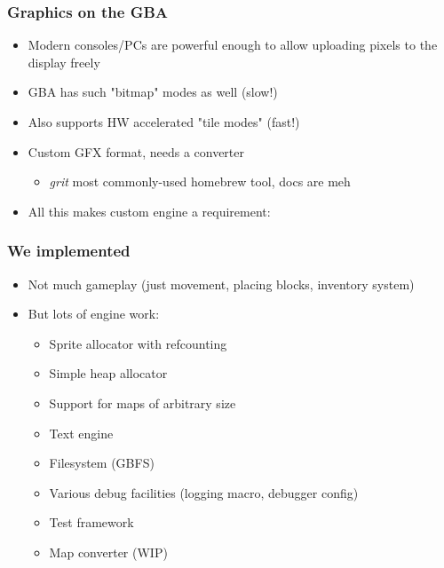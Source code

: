 \documentclass{beamer}
\begin{document}
\begin{frame}
	\frametitle{Graphics on the GBA}
	\begin{itemize}
		\item Modern consoles/PCs are powerful enough to allow uploading pixels to the display freely
		\item GBA has such "bitmap" modes as well (slow!)
		\item Also supports HW accelerated "tile modes" (fast!)
		\item Custom GFX format, needs a converter \begin{itemize}
			      \item \emph{grit} most commonly-used homebrew tool, docs are meh
		      \end{itemize}
		\item All this makes custom engine a requirement:
	\end{itemize}
\end{frame}

\begin{frame}
	\frametitle{We implemented}
	\begin{itemize}
		\item Not much gameplay (just movement, placing blocks, inventory system)
		\item But lots of engine work: \begin{itemize}
			      \item Sprite allocator with refcounting
			      \item Simple heap allocator
			      \item Support for maps of arbitrary size
			      \item Text engine
			      \item Filesystem (GBFS)
			      \item Various debug facilities (logging macro, debugger config)
			      \item Test framework
			      \item Map converter (WIP)
		      \end{itemize}
	\end{itemize}
\end{frame}
\end{document}
